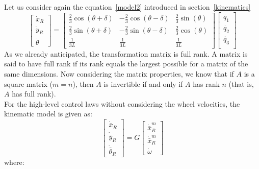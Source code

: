 Let us consider again the equation~\ref{model2} introduced in section~\ref{kinematics}
\begin{equation*}
	\begin{bmatrix}
		\dot{x}_R\\
		\dot{y}_R\\
		\dot{\theta}
	\end{bmatrix} =
	\begin{bmatrix}
		\frac{2}{3}\cos(\theta+\delta) & -\frac{2}{3}\cos(\theta-\delta) & \frac{2}{3}\sin(\theta)\\
		\frac{2}{3}\sin(\theta+\delta) & -\frac{2}{3}\sin(\theta-\delta) & \frac{2}{3}\cos(\theta)\\
		\frac{1}{3L} & \frac{1}{3L} & \frac{1}{3L}
	\end{bmatrix}
	\begin{bmatrix}
		\dot{q_1}\\
		\dot{q_2}\\
		\dot{q_3}\\
	\end{bmatrix}	
\end{equation*}
As we already anticipated, the transformation matrix is full rank. A matrix is said to have full rank if its rank equals the largest possible for a matrix of the same dimensions. Now considering the matrix properties, we know that if $A$ is a square matrix ($m = n$), then $A$ is invertible if and only if $A$ has rank $n$ (that is, $A$ has full rank).\\
For the high-level control laws without considering the wheel velocities, the kinematic model is given as:
\begin{equation}
\begin{bmatrix}
\dot{\bar{x}}_R\\
\dot{\bar{y}}_R\\
\dot{\bar{\theta}}_R
\end{bmatrix}
= G
\begin{bmatrix}
\dot{\bar{x}}_R^m\\
\dot{\bar{x}}_R^m\\
\dot{\omega}
\end{bmatrix}
\label{controllaw}
\end{equation}
where:

